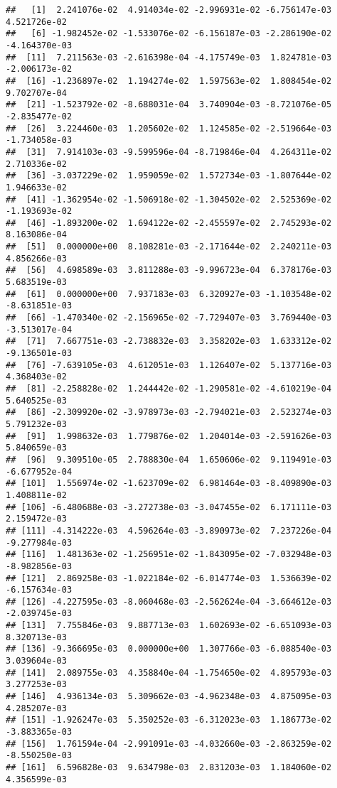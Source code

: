 \documentclass[
]{article}
\begin{document}
\begin{verbatim}
##   [1]  2.241076e-02  4.914034e-02 -2.996931e-02 -6.756147e-03  4.521726e-02
##   [6] -1.982452e-02 -1.533076e-02 -6.156187e-03 -2.286190e-02 -4.164370e-03
##  [11]  7.211563e-03 -2.616398e-04 -4.175749e-03  1.824781e-03 -2.006173e-02
##  [16] -1.236897e-02  1.194274e-02  1.597563e-02  1.808454e-02  9.702707e-04
##  [21] -1.523792e-02 -8.688031e-04  3.740904e-03 -8.721076e-05 -2.835477e-02
##  [26]  3.224460e-03  1.205602e-02  1.124585e-02 -2.519664e-03 -1.734058e-03
##  [31]  7.914103e-03 -9.599596e-04 -8.719846e-04  4.264311e-02  2.710336e-02
##  [36] -3.037229e-02  1.959059e-02  1.572734e-03 -1.807644e-02  1.946633e-02
##  [41] -1.362954e-02 -1.506918e-02 -1.304502e-02  2.525369e-02 -1.193693e-02
##  [46] -1.893200e-02  1.694122e-02 -2.455597e-02  2.745293e-02  8.163086e-04
##  [51]  0.000000e+00  8.108281e-03 -2.171644e-02  2.240211e-03  4.856266e-03
##  [56]  4.698589e-03  3.811288e-03 -9.996723e-04  6.378176e-03  5.683519e-03
##  [61]  0.000000e+00  7.937183e-03  6.320927e-03 -1.103548e-02 -8.631851e-03
##  [66] -1.470340e-02 -2.156965e-02 -7.729407e-03  3.769440e-03 -3.513017e-04
##  [71]  7.667751e-03 -2.738832e-03  3.358202e-03  1.633312e-02 -9.136501e-03
##  [76] -7.639105e-03  4.612051e-03  1.126407e-02  5.137716e-03  4.368403e-02
##  [81] -2.258828e-02  1.244442e-02 -1.290581e-02 -4.610219e-04  5.640525e-03
##  [86] -2.309920e-02 -3.978973e-03 -2.794021e-03  2.523274e-03  5.791232e-03
##  [91]  1.998632e-03  1.779876e-02  1.204014e-03 -2.591626e-03  5.840659e-03
##  [96]  9.309510e-05  2.788830e-04  1.650606e-02  9.119491e-03 -6.677952e-04
## [101]  1.556974e-02 -1.623709e-02  6.981464e-03 -8.409890e-03  1.408811e-02
## [106] -6.480688e-03 -3.272738e-03 -3.047455e-02  6.171111e-03  2.159472e-03
## [111] -4.314222e-03  4.596264e-03 -3.890973e-02  7.237226e-04 -9.277984e-03
## [116]  1.481363e-02 -1.256951e-02 -1.843095e-02 -7.032948e-03 -8.982856e-03
## [121]  2.869258e-03 -1.022184e-02 -6.014774e-03  1.536639e-02 -6.157634e-03
## [126] -4.227595e-03 -8.060468e-03 -2.562624e-04 -3.664612e-03 -2.039745e-03
## [131]  7.755846e-03  9.887713e-03  1.602693e-02 -6.651093e-03  8.320713e-03
## [136] -9.366695e-03  0.000000e+00  1.307766e-03 -6.088540e-03  3.039604e-03
## [141]  2.089755e-03  4.358840e-04 -1.754650e-02  4.895793e-03  3.277253e-03
## [146]  4.936134e-03  5.309662e-03 -4.962348e-03  4.875095e-03  4.285207e-03
## [151] -1.926247e-03  5.350252e-03 -6.312023e-03  1.186773e-02 -3.883365e-03
## [156]  1.761594e-04 -2.991091e-03 -4.032660e-03 -2.863259e-02 -8.550250e-03
## [161]  6.596828e-03  9.634798e-03  2.831203e-03  1.184060e-02  4.356599e-03

\end{verbatim}
\end{document}
